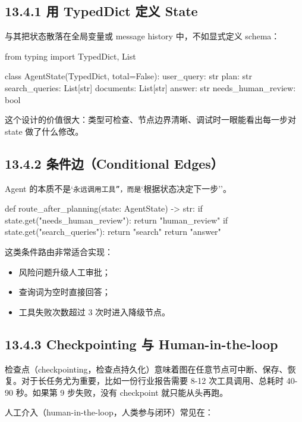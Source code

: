 \subsection{13.4.1 用 TypedDict 定义 State}

与其把状态散落在全局变量或 message history 中，不如显式定义 schema：


\begin{codeblock}
from typing import TypedDict, List

class AgentState(TypedDict, total=False):
    user_query: str
    plan: str
    search_queries: List[str]
    documents: List[str]
    answer: str
    needs_human_review: bool
\end{codeblock}

这个设计的价值很大：类型可检查、节点边界清晰、调试时一眼能看出每一步对 state 做了什么修改。


\subsection{13.4.2 条件边（Conditional Edges）}

Agent 的本质不是`\texttt{永远调用工具''，而是}`根据状态决定下一步''。


\begin{codeblock}
def route_after_planning(state: AgentState) -> str:
    if state.get("needs_human_review"):
        return "human_review"
    if state.get("search_queries"):
        return "search"
    return "answer"
\end{codeblock}

这类条件路由非常适合实现：


\begin{itemize}[leftmargin=2em]
\item 风险问题升级人工审批；
\item 查询词为空时直接回答；
\item 工具失败次数超过 3 次时进入降级节点。
\end{itemize}

\subsection{13.4.3 Checkpointing 与 Human-in-the-loop}

检查点（checkpointing，检查点持久化）意味着图在任意节点可中断、保存、恢复。对于长任务尤为重要，比如一份行业报告需要 8-12 次工具调用、总耗时 40-90 秒。如果第 9 步失败，没有 checkpoint 就只能从头再跑。


人工介入（human-in-the-loop，人类参与闭环）常见在：



